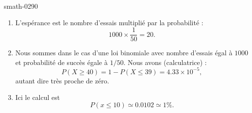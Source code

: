 
\begin{corrige}{smath-0290}

    \begin{enumerate}
        \item
            L'espérance est le nombre d'essais multiplié par la probabilité :
            \begin{equation}
                1000\times\frac{1}{ 50 }=20.
            \end{equation}
        \item
            Nous sommes dans le cas d'une loi binomiale avec nombre d'essais égal à \( 1000\) et probabilité de succès égale à \( 1/50\). Nous avons (calculatrice) :
            \begin{equation}
                P(X\geq 40)=1-P(X\leq 39)=4.33\times 10^{-5},
            \end{equation}
            autant dire très proche de zéro.
        \item
            Ici le calcul est
            \begin{equation}
                P(x\leq 10)\simeq 0.0102\simeq 1\%.
            \end{equation}
    \end{enumerate}

\end{corrige}
